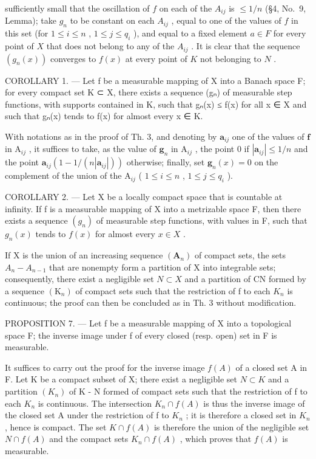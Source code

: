 sufficiently small that the oscillation of \(f\) on each of the \(A_{ij}\) is \(\leqslant 1/n\) (§4, No.~9, Lemma); take \(g_n\) to be constant on each \(A_{ij}\) , equal to one of the values of \(f\) in this set (for \(1 \leqslant i \leqslant n\) , \(1 \leqslant j \leqslant q_i\) ), and equal to a fixed element \(a \in F\) for every point of \(X\) that does not belong to any of the \(A_{ij}\) . It is clear that the sequence \((g_n(x))\) converges to \(f(x)\) at every point of \(K\) not belonging to \(N\) .

COROLLARY 1. --- Let f be a measurable mapping of X into a Banach space F; for every compact set K ⊂ X, there exists a sequence (gₙ) of measurable step functions, with supports contained in K, such that \textbar gₙ(x)\textbar{} ≤ \textbar f(x)\textbar{} for all x ∈ X and such that gₙ(x) tends to f(x) for almost every x ∈ K.

With notations as in the proof of Th. 3, and denoting by \(\mathbf{a}_{ij}\) one of the values of \(\mathbf{f}\) in \(\mathrm{A}_{ij}\) , it suffices to take, as the value of \(\mathbf{g}_n\) in \(\mathrm{A}_{ij}\) , the point 0 if \(|\mathbf{a}_{ij}| \leqslant 1/n\) and the point \(\mathbf{a}_{ij}(1 - 1/(n|\mathbf{a}_{ij}|))\) otherwise; finally, set \(\mathbf{g}_n(x) = 0\) on the complement of the union of the \(\mathrm{A}_{ij}\) ( \(1 \leqslant i \leqslant n\) , \(1 \leqslant j \leqslant q_i\) ).

COROLLARY 2. --- Let X be a locally compact space that is countable at infinity. If f is a measurable mapping of X into a metrizable space F, then there exists a sequence \((g_{n})\) of measurable step functions, with values in F, such that \(g_{n}(x)\) tends to \(f(x)\) for almost every \(x \in X\) .

If X is the union of an increasing sequence \((\mathbf{A}_{n})\) of compact sets, the sets \(A_{n}-A_{n-1}\) that are nonempty form a partition of X into integrable sets; consequently, there exist a negligible set \(N\subset X\) and a partition of CN formed by a sequence \((\mathrm{K}_{n})\) of compact sets such that the restriction of f to each \(K_{n}\) is continuous; the proof can then be concluded as in Th. 3 without modification.

PROPOSITION 7. --- Let f be a measurable mapping of X into a topological space F; the inverse image under f of every closed (resp. open) set in F is measurable.

It suffices to carry out the proof for the inverse image \(f(A)\) of a closed set A in F. Let K be a compact subset of X; there exist a negligible set \(N \subset K\) and a partition \((K_n)\) of K - N formed of compact sets such that the restriction of f to each \(K_n\) is continuous. The intersection \(K_n \cap f(A)\) is thus the inverse image of the closed set A under the restriction of f to \(K_n\) ; it is therefore a closed set in \(K_n\) , hence is compact. The set \(K \cap f(A)\) is therefore the union of the negligible set \(N \cap f(A)\) and the compact sets \(K_n \cap f(A)\) , which proves that \(f(A)\) is measurable.

